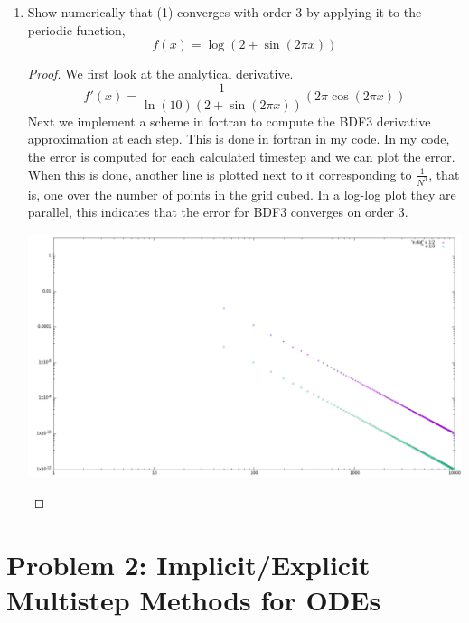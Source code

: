 \documentclass{article}
\begin{document}
\begin{enumerate}[label=\alph*)]
    
    \item Show numerically that (1) converges with order 3 by applying it to the periodic
function, 
        \[
            f(x) = \log(2 + \sin(2\pi x))
        \]
    \begin{proof}
    
        We first look at the analytical derivative. 
        \[
            f'(x) = \frac{1}{\ln(10)(2 + \sin(2\pi x))}(2\pi\cos(2\pi x))
        \]
        Next we implement a scheme in fortran to compute the BDF3 derivative approximation at each step. This is done in fortran in my code. In my code, the error is computed for each calculated timestep and we can plot the error. When this is done, another line is plotted next to it corresponding to $\frac{1}{N^3}$, that is, one over the number of points in the grid cubed. In a log-log plot they are parallel, this indicates that the error for BDF3 converges on order 3.

        \begin{center}
            \includegraphics[width=.9\textwidth]{../fortran/BDF3_error.png}
        \end{center}
        
    \end{proof}
        

\end{enumerate}


\section*{Problem 2: Implicit/Explicit Multistep Methods for ODEs}
\end{document}
